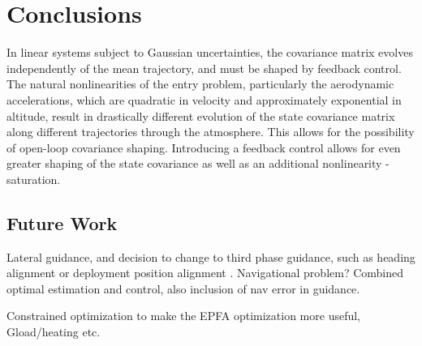 \chapter{Conclusions}

In linear systems subject to Gaussian uncertainties, the covariance matrix evolves independently of the mean trajectory, and must be shaped by feedback control. The natural nonlinearities of the entry problem, particularly the aerodynamic accelerations, which are quadratic in velocity and approximately exponential in altitude, result in drastically different evolution of the state covariance matrix along different trajectories through the atmosphere. This allows for the possibility of open-loop covariance shaping. Introducing a feedback control allows for even greater shaping of the state covariance as well as an additional nonlinearity - saturation. 

\section{Future Work}
Lateral guidance, and decision to change to third phase guidance, such as heading alignment or deployment position alignment \cite{GuangfeiDissertation}.
Navigational problem? Combined optimal estimation and control, also inclusion of nav error in guidance. 

Constrained optimization to make the EPFA optimization more useful, Gload/heating etc. 

